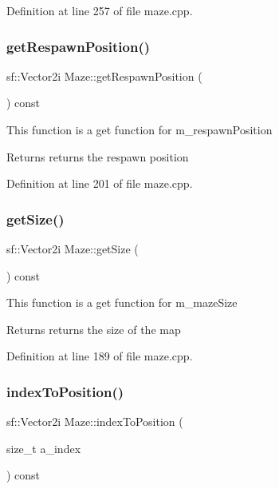 Definition at line 257 of file maze.\+cpp.

\mbox{\label{class_maze_a245890f620b8d7ac3445fd4ca0d090e1}} 
\subsubsection{\texorpdfstring{get\+Respawn\+Position()}{getRespawnPosition()}}
{\footnotesize\ttfamily sf\+::\+Vector2i Maze\+::get\+Respawn\+Position (\begin{DoxyParamCaption}{ }\end{DoxyParamCaption}) const}

This function is a get function for m\+\_\+respawn\+Position

\begin{DoxyReturn}{Returns}
returns the respawn position 
\end{DoxyReturn}


Definition at line 201 of file maze.\+cpp.

\mbox{\label{class_maze_a664b89e39391a1551babb93556cb36f8}} 
\subsubsection{\texorpdfstring{get\+Size()}{getSize()}}
{\footnotesize\ttfamily sf\+::\+Vector2i Maze\+::get\+Size (\begin{DoxyParamCaption}{ }\end{DoxyParamCaption}) const}

This function is a get function for m\+\_\+maze\+Size

\begin{DoxyReturn}{Returns}
returns the size of the map 
\end{DoxyReturn}


Definition at line 189 of file maze.\+cpp.

\mbox{\label{class_maze_ac256166dfc46cc089de0c998295dbc66}} 
\subsubsection{\texorpdfstring{index\+To\+Position()}{indexToPosition()}}
{\footnotesize\ttfamily sf\+::\+Vector2i Maze\+::index\+To\+Position (\begin{DoxyParamCaption}\item[{size\+\_\+t}]{a\+\_\+index }\end{DoxyParamCaption}) const\hspace{0.3cm}{\ttfamily [inline]}}

